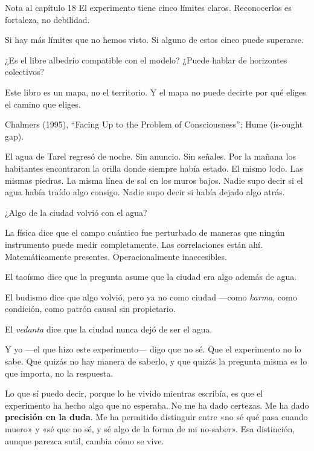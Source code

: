 \begin{notacap}{Nota al capítulo 18}
 El experimento tiene cinco límites claros. Reconocerlos es fortaleza, no debilidad.

 Si hay más límites que no hemos visto. Si alguno de estos cinco puede superarse.

 ¿Es el libre albedrío compatible con el modelo? ¿Puede hablar de horizontes colectivos?

 Este libro es un mapa, no el territorio. Y el mapa no puede decirte por qué eliges el camino que eliges.

 Chalmers (1995), “Facing Up to the Problem of Consciousness”; Hume (is-ought gap).
\end{notacap}
\begin{cita}
El agua de Tarel regresó de noche. Sin anuncio. Sin señales. Por la mañana los habitantes encontraron la orilla donde siempre había estado. El mismo lodo. Las mismas piedras. La misma línea de sal en los muros bajos. Nadie supo decir si el agua había traído algo consigo. Nadie supo decir si había dejado algo atrás.
\end{cita}
\noindent {}

¿Algo de la ciudad volvió con el agua?

La física dice que el campo cuántico fue perturbado de maneras que ningún instrumento puede medir completamente. Las correlaciones están ahí. Matemáticamente presentes. Operacionalmente inaccesibles.

El taoísmo dice que la pregunta asume que la ciudad era algo además de agua.

El budismo dice que algo volvió, pero ya no como ciudad —como \emph{karma}, como condición, como patrón causal sin propietario.

El \emph{vedanta} dice que la ciudad nunca dejó de ser el agua.

Y yo —el que hizo este experimento— digo que no sé. Que el experimento no lo sabe. Que quizás no hay manera de saberlo, y que quizás la pregunta misma es lo que importa, no la respuesta.

Lo que sí puedo decir, porque lo he vivido mientras escribía, es que el experimento ha hecho algo que no esperaba. No me ha dado certezas. Me ha dado \textbf{precisión en la duda}. Me ha permitido distinguir entre «no sé qué pasa cuando muero» y «sé que no sé, y sé algo de la forma de mi no-saber». Esa distinción, aunque parezca sutil, cambia cómo se vive.

